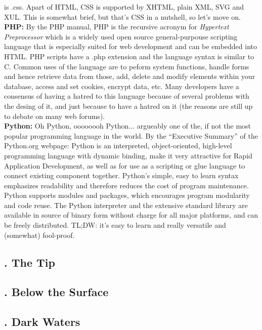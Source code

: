 \documentclass[letterpaper, 12pt]{article}
\begin{document}
is .css. Apart of HTML, CSS is supported by XHTML, plain XML, SVG and XUL. This is somewhat brief, but that's CSS in a nutshell, so let's move on.
\\\newline
\textbf{PHP:} By the PHP manual, PHP is the recursive acronym for \emph{Hypertext Preprocessor} which is a widely used open source general-purpouse scripting language that is especially suited for web development and can be embedded into HTML. PHP scripts have a .php extension and the language syntax is similar to C. Common uses of the language are to peform system functions, handle forms and hence retrieve data from those,
add, delete and modify elements within your database, access and set cookies, encrypt data, etc. Many developers have a consensus of having a hatred to this language because of several problems with the desing of it, and just because to have a hatred on it (the reasons are still up to debate on many web forums).
\\\newline
\textbf{Python:} Oh Python, oooooooh Python... argueably one of the, if not the most popular programming language in the world. By the ``Executive Summary'' of the Python.org webpage: Python is an interpreted, object-oriented, high-level programming language with dynamic binding, make it very attractive for Rapid Application Development, as well as for use as a scripting or glue language to connect existing component together.
Python's simple, easy to learn syntax emphasizes readability and therefore reduces the cost of program maintenance. Python supports modules and packages, which encourages program modularity and code reuse. The Python interpreter and the extensive standard library are available in source of binary form without charge for all major platforms, and can be freely distributed. TL;DW: it's easy to learn and really versatile and (somewhat) fool-proof. 

\subsection*{{. The Tip}} \justify

\subsection*{{. Below the Surface}} \justify

\subsection*{{. Dark Waters}} \justify
\end{document}
